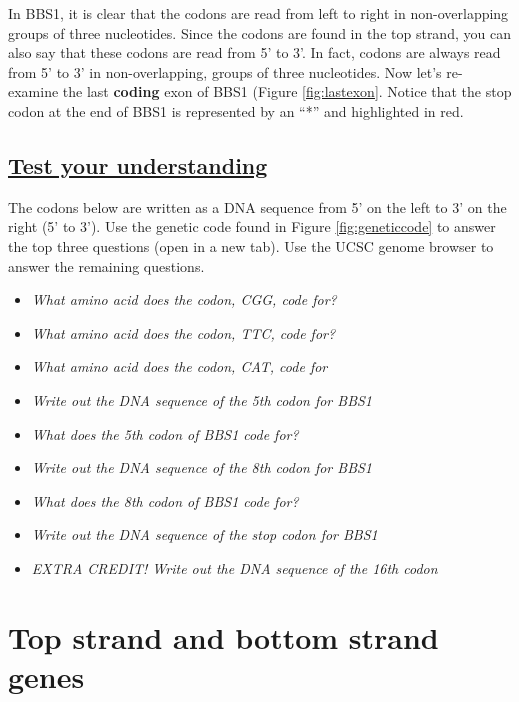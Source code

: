 \documentclass[
]{book}
\providecommand{\tightlist}{%
  \setlength{\itemsep}{0pt}\setlength{\parskip}{0pt}}
\begin{document}
In BBS1, it is clear that the codons are read from left to right in non-overlapping groups of three nucleotides. Since the codons are found in the top strand, you can also say that these codons are read from 5' to 3'. In fact, codons are always read from 5' to 3' in non-overlapping, groups of three nucleotides. Now let's re-examine the last \textbf{coding} exon of BBS1 (Figure \ref{fig:lastexon}. Notice that the stop codon at the end of BBS1 is represented by an ``*'' and highlighted in red.

\hypertarget{test-your-understanding-5}{%
\subsection{\texorpdfstring{\href{https://forms.gle/LUjW3ngaerH1ipeV6}{Test your understanding}}{Test your understanding}}\label{test-your-understanding-5}}

The codons below are written as a DNA sequence from 5' on the left to 3' on the right (5' to 3'). Use the genetic code found in Figure \ref{fig:geneticcode} to answer the top three questions (open in a new tab). Use the UCSC genome browser to answer the remaining questions.

\begin{itemize}
\tightlist
\item
  \emph{What amino acid does the codon, CGG, code for?}
\item
  \emph{What amino acid does the codon, TTC, code for?}
\item
  \emph{What amino acid does the codon, CAT, code for}
\item
  \emph{Write out the DNA sequence of the 5th codon for BBS1}
\item
  \emph{What does the 5th codon of BBS1 code for?}
\item
  \emph{Write out the DNA sequence of the 8th codon for BBS1}
\item
  \emph{What does the 8th codon of BBS1 code for?}
\item
  \emph{Write out the DNA sequence of the stop codon for BBS1}
\item
  \emph{EXTRA CREDIT! Write out the DNA sequence of the 16th codon}
\end{itemize}

\hypertarget{top-strand-and-bottom-strand-genes}{%
\section{Top strand and bottom strand genes}\label{top-strand-and-bottom-strand-genes}}
\end{document}
